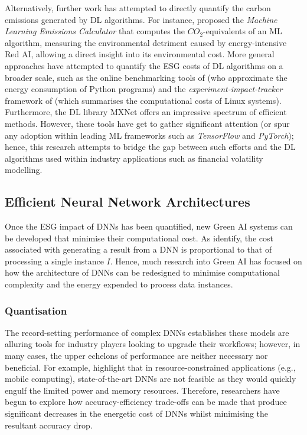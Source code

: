 \documentclass[a4paper, 11pt]{report}
\begin{document}
    Alternatively, further work has attempted to directly quantify the carbon emissions generated by DL algorithms. For instance, \citet{lacoste-2019} proposed the \emph{Machine Learning Emissions Calculator} that computes the $CO_2$-equivalents of an ML algorithm, measuring the environmental detriment caused by energy-intensive Red AI, allowing a direct insight into its environmental cost. More general approaches have attempted to quantify the ESG costs of DL algorithms on a broader scale, such as the online benchmarking tools of \citet{lottick-2019} (who approximate the energy consumption of Python programs) and the \emph{experiment-impact-tracker} framework of \citet{henderson-2020} (which summarises the computational costs of Linux systems). Furthermore, the DL library MXNet \citep{chen-2015} offers an impressive spectrum of efficient methods. However, these tools have get to gather significant attention (or spur any adoption within leading ML frameworks such as \emph{TensorFlow} and \emph{PyTorch}); hence, this research attempts to bridge the gap between such efforts and the DL algorithms used within industry applications such as financial volatility modelling.


    \subsection{Efficient Neural Network Architectures}

    Once the ESG impact of DNNs has been quantified, new Green AI systems can be developed that minimise their computational cost. As \citet{schwartz-2019} identify, the cost associated with generating a result from a DNN is proportional to that of processing a single instance $I$. Hence, much research into Green AI has focused on how the architecture of DNNs can be redesigned to minimise computational complexity and the energy expended to process data instances. 


    \subsubsection{Quantisation}
    \label{section: quantisation}

    The record-setting performance of complex DNNs establishes these models are alluring tools for industry players looking to upgrade their workflows; however, in many cases, the upper echelons of performance are neither necessary nor beneficial. For example, \citet{kumar-2020} highlight that in resource-constrained applications (e.g., mobile computing), state-of-the-art DNNs are not feasible as they would quickly engulf the limited power and memory resources. Therefore, researchers have begun to explore how accuracy-efficiency trade-offs can be made that produce significant decreases in the energetic cost of DNNs whilst minimising the resultant accuracy drop.
    
\end{document}
